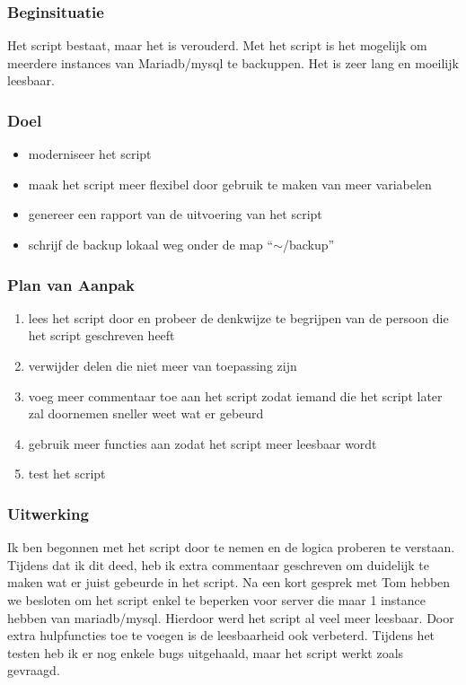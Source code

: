 \subsubsection{Beginsituatie}

Het script bestaat, maar het is verouderd. Met het script is het mogelijk om meerdere instances van Mariadb/mysql te backuppen. Het is zeer lang en moeilijk leesbaar.

\subsubsection{Doel}

\begin{itemize}
    \item moderniseer het script
    \item maak het script meer flexibel door gebruik te maken van meer variabelen
    \item genereer een rapport van de uitvoering van het script
    \item schrijf de backup lokaal weg onder de map ``$\sim$/backup''
\end{itemize}

\subsubsection{Plan van Aanpak}

\begin{enumerate}
    \item lees het script door en probeer de denkwijze te begrijpen van de persoon die het script geschreven heeft
    \item verwijder delen die niet meer van toepassing zijn
    \item voeg meer commentaar toe aan het script zodat iemand die het script later zal doornemen sneller weet wat er gebeurd
    \item gebruik meer functies aan zodat het script meer leesbaar wordt
    \item test het script
\end{enumerate}

\subsubsection{Uitwerking}

Ik ben begonnen met het script door te nemen en de logica proberen te verstaan. Tijdens dat ik dit deed, heb ik extra commentaar geschreven om duidelijk te maken wat er juist gebeurde in het script. Na een kort gesprek met Tom hebben we besloten om het script enkel te beperken voor server die maar 1 instance hebben van mariadb/mysql. Hierdoor werd het script al veel meer leesbaar. Door extra hulpfuncties toe te voegen is de leesbaarheid ook verbeterd. Tijdens het testen heb ik er nog enkele bugs uitgehaald, maar het script werkt zoals gevraagd.

